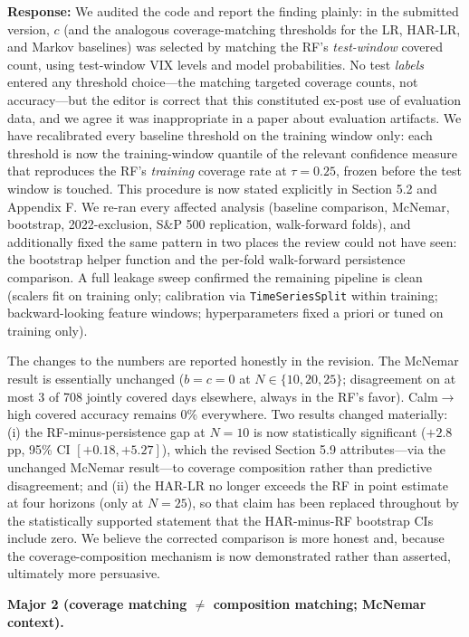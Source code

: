 \documentclass[11pt]{article}
\newcommand{\response}{\textbf{Response:} }
\begin{document}
\response We audited the code and report the finding plainly: in the submitted version, $c$
(and the analogous coverage-matching thresholds for the LR, HAR-LR, and Markov baselines) was
selected by matching the RF's \emph{test-window} covered count, using test-window VIX levels
and model probabilities. No test \emph{labels} entered any threshold choice---the matching
targeted coverage counts, not accuracy---but the editor is correct that this constituted
ex-post use of evaluation data, and we agree it was inappropriate in a paper about evaluation
artifacts. We have recalibrated every baseline threshold on the training window only: each
threshold is now the training-window quantile of the relevant confidence measure that
reproduces the RF's \emph{training} coverage rate at $\tau = 0.25$, frozen before the test
window is touched. This procedure is now stated explicitly in Section 5.2 and Appendix F. We
re-ran every affected analysis (baseline comparison, McNemar, bootstrap, 2022-exclusion,
S\&P 500 replication, walk-forward folds), and additionally fixed the same pattern in two
places the review could not have seen: the bootstrap helper function and the per-fold
walk-forward persistence comparison. A full leakage sweep confirmed the remaining pipeline is
clean (scalers fit on training only; calibration via \texttt{TimeSeriesSplit} within training;
backward-looking feature windows; hyperparameters fixed a priori or tuned on training only).

The changes to the numbers are reported honestly in the revision. The McNemar result is
essentially unchanged ($b = c = 0$ at $N \in \{10, 20, 25\}$; disagreement on at most 3 of 708
jointly covered days elsewhere, always in the RF's favor). Calm$\to$high covered accuracy
remains 0\% everywhere. Two results changed materially: (i) the RF-minus-persistence gap at
$N = 10$ is now statistically significant ($+2.8$ pp, 95\% CI $[+0.18, +5.27]$), which the
revised Section 5.9 attributes---via the unchanged McNemar result---to coverage composition
rather than predictive disagreement; and (ii) the HAR-LR no longer exceeds the RF in point
estimate at four horizons (only at $N = 25$), so that claim has been replaced throughout by
the statistically supported statement that the HAR-minus-RF bootstrap CIs include zero. We
believe the corrected comparison is more honest and, because the coverage-composition
mechanism is now demonstrated rather than asserted, ultimately more persuasive.

\textbf{Major 2 (coverage matching $\neq$ composition matching; McNemar context).}
\end{document}
